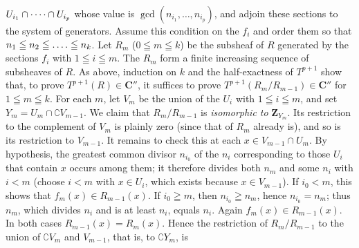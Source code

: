 $U_{i_1}\cap\mathinner{\cdotp\cdotp\cdotp\cdotp}\cap U_{i_p}$ whose value is
$\gcd(n_{i_1},\ldots,n_{i_p})$, and adjoin these sections to the system of
generators.
Assume this condition on the $f_i$ and order them so that
$n_1\leqq n_2\leqq\mathinner{.\,.\,.\,.}\leqq n_k$. Let $R_m$ ($0\leqq m\leqq k$) be the subsheaf
of $R$ generated by the sections $f_i$ with $1\leqq i\leqq m$. The $R_m$ form a
finite increasing sequence of subsheaves of $R$.
As above, induction on $k$ and the half-exactness of $T^{p+1}$ show that, to
prove $T^{p+1}(R)\in \mathbf C''$, it suffices to prove
$T^{p+1}(R_m/R_{m-1})\in \mathbf C''$ for $1\leqq m\leqq k$.
For each $m$, let $V_m$ be the union of the $U_i$ with $1\leqq i\leqq m$, and set
$Y_m=U_m\cap \complement V_{m-1}$.
We claim that $R_m/R_{m-1}$ is \textit{isomorphic to} $\mathbf Z_{Y_m}$.
Its restriction to the complement of $V_m$ is plainly zero (since that of
$R_m$ already is), and so is its restriction to $V_{m-1}$. It remains to check
this at each $x\in V_{m-1}\cap U_m$. By hypothesis, the greatest common divisor
$n_{i_0}$ of the $n_i$ corresponding to those $U_i$ that contain $x$ occurs
among them; it therefore divides both $n_m$ and some $n_i$ with $i<m$ (choose
$i<m$ with $x\in U_i$, which exists because $x\in V_{m-1}$). If $i_0<m$, this
shows that $f_m(x)\in R_{m-1}(x)$. If $i_0\geqq m$, then
$n_{i_0}\geqq n_m$, hence $n_{i_0}=n_m$; thus $n_m$, which divides $n_i$ and is
at least $n_i$, equals $n_i$. Again $f_m(x)\in R_{m-1}(x)$. In both cases
$R_{m-1}(x)=R_m(x)$. Hence the restriction of $R_m/R_{m-1}$ to the union of
$\complement V_m$ and $V_{m-1}$, that is, to $\complement Y_m$, is

